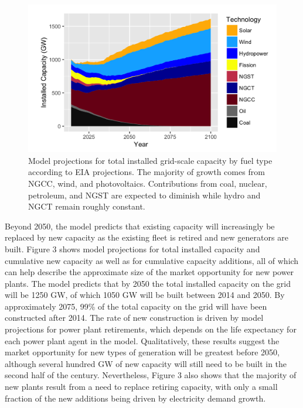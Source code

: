 \documentclass[review]{elsarticle}
\begin{document}
\begin{figure}
\begin{center}
\includegraphics[width=\textwidth]{Fig4_2.png}
\end{center}
\caption{Model projections for total installed grid-scale capacity by fuel type according to EIA projections. The majority of growth comes from NGCC, wind, and photovoltaics. Contributions from coal, nuclear, petroleum, and NGST are expected to diminish while hydro and NGCT remain roughly constant.}
\label{fig:without_nuclear}
\end{figure}

Beyond 2050, the model predicts that existing capacity will increasingly be replaced by new capacity as the existing fleet is retired and new generators are built. Figure 3 shows model projections for total installed capacity and cumulative new capacity as well as for cumulative capacity additions, all of which can help describe the approximate size of the market opportunity for new power plants. The model predicts that by 2050 the total installed capacity on the grid will be 1250 GW, of which 1050 GW will be built between 2014 and 2050. By approximately 2075, 99\% of the total capacity on the grid will have been constructed after 2014. The rate of new construction is driven by model projections for power plant retirements, which depends on the life expectancy for each power plant agent in the model. Qualitatively, these results suggest the market opportunity for new types of generation will be greatest before 2050, although several hundred GW of new capacity will still need to be built in the second half of the century. Nevertheless, Figure 3 also shows that the majority of new plants result from a need to replace retiring capacity, with only a small fraction of the new additions being driven by electricity demand growth.
\end{document}
